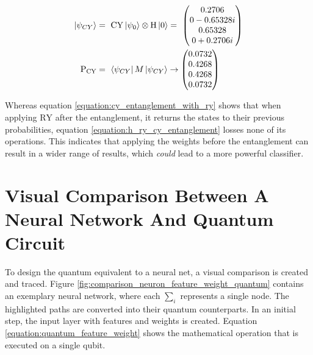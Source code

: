 \begin{equation}
    \centering
    \begin{split}
    \ket{\psi_{CY}} &=\ \mathrm{CY}\ket{\psi_0}\otimes\mathrm{H}\ket{0} =\ \begin{pmatrix}
     0.2706\\
     0-0.65328i\\
     0.65328\\
     0+0.2706i\\
     \end{pmatrix} \\
    \mathrm{P_{CY}} &=\ \bra{\psi_{CY}}M\ket{\psi_{CY}} \rightarrow \begin{pmatrix}
    0.0732\\
    0.4268\\
    0.4268\\
    0.0732\\
     \end{pmatrix}
    \end{split}
    \label{equation:h_ry_cy_entanglement}
\end{equation}

Whereas equation \ref{equation:cy_entanglement_with_ry} shows that when applying $\mathrm{RY}$ after the entanglement, it returns the states to their previous probabilities, equation \ref{equation:h_ry_cy_entanglement} losses none of its operations. This indicates that applying the weights before the entanglement can result in a wider range of results, which \emph{could} lead to a more powerful classifier.

\clearpage
\section{Visual Comparison Between A Neural Network And Quantum Circuit}

To design the quantum equivalent to a neural net, a visual comparison is created and traced. Figure \ref{fig:comparison_neuron_feature_weight_quantum} contains an exemplary neural network, where each $\sum_i$ represents a single node. The highlighted paths are converted into their quantum counterparts. In an initial step, the input layer with features and weights is created. Equation \ref{equation:quantum_feature_weight} shows the mathematical operation that is executed on a single qubit.

